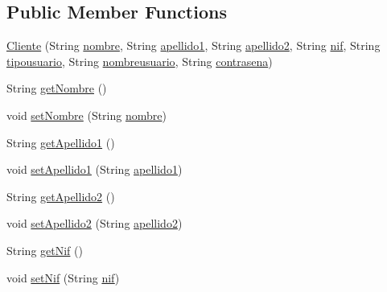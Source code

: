 \subsection*{Public Member Functions}
\begin{DoxyCompactItemize}
\item 
\mbox{\hyperlink{classlibreria_1_1_cliente_a1f6808b375b657135a0e5fc66d37c98c}{Cliente}} (String \mbox{\hyperlink{classlibreria_1_1_cliente_ab7862ac1d181becc7cf8a88ecf07b570}{nombre}}, String \mbox{\hyperlink{classlibreria_1_1_cliente_a9f1a869f9f8b0e14df73be50e636532e}{apellido1}}, String \mbox{\hyperlink{classlibreria_1_1_cliente_a9b97686667a729a4c0fd8b19d72b389a}{apellido2}}, String \mbox{\hyperlink{classlibreria_1_1_cliente_a6d50af0b6448c8ac66e9ae08c436cdfe}{nif}}, String \mbox{\hyperlink{classlibreria_1_1_cliente_a7b289ea086987adbd145bf6dc8024e9e}{tipousuario}}, String \mbox{\hyperlink{classlibreria_1_1_cliente_a3018645e586ef4b1abef3ac1a7f2a464}{nombreusuario}}, String \mbox{\hyperlink{classlibreria_1_1_cliente_a0d80894cab7e9d1e3b531d29cf160737}{contrasena}})
\item 
String \mbox{\hyperlink{classlibreria_1_1_cliente_a4d318e045a10b2b77ef640e66c99e15c}{get\+Nombre}} ()
\item 
void \mbox{\hyperlink{classlibreria_1_1_cliente_a6c073e25efa594766ab6f322bc566d1b}{set\+Nombre}} (String \mbox{\hyperlink{classlibreria_1_1_cliente_ab7862ac1d181becc7cf8a88ecf07b570}{nombre}})
\item 
String \mbox{\hyperlink{classlibreria_1_1_cliente_a37166f7280771768679b29491274a82f}{get\+Apellido1}} ()
\item 
void \mbox{\hyperlink{classlibreria_1_1_cliente_ad0a2505f0630318dca0221c8550c32b8}{set\+Apellido1}} (String \mbox{\hyperlink{classlibreria_1_1_cliente_a9f1a869f9f8b0e14df73be50e636532e}{apellido1}})
\item 
String \mbox{\hyperlink{classlibreria_1_1_cliente_a884280e953d829fad5160128b11315af}{get\+Apellido2}} ()
\item 
void \mbox{\hyperlink{classlibreria_1_1_cliente_ad147b6ba3437c2fbcdd79094c7d07743}{set\+Apellido2}} (String \mbox{\hyperlink{classlibreria_1_1_cliente_a9b97686667a729a4c0fd8b19d72b389a}{apellido2}})
\item 
String \mbox{\hyperlink{classlibreria_1_1_cliente_afd350599d37e993f4ab78c71c5a0979d}{get\+Nif}} ()
\item 
void \mbox{\hyperlink{classlibreria_1_1_cliente_a2c5a66f0c73787d2f0e316a2a01159f1}{set\+Nif}} (String \mbox{\hyperlink{classlibreria_1_1_cliente_a6d50af0b6448c8ac66e9ae08c436cdfe}{nif}})

\end{DoxyCompactItemize}
